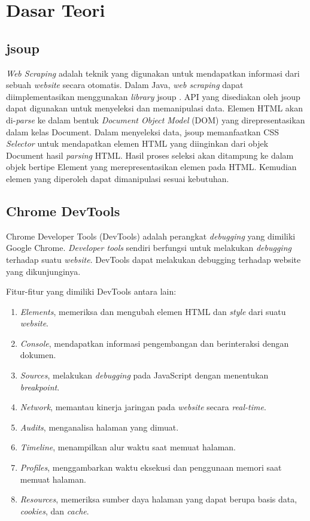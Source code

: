\chapter{Dasar Teori}
\label{chap:Dasar Teori}

\section{jsoup}
\label{sec:jsoup}

\textit{Web Scraping} adalah teknik yang digunakan untuk mendapatkan informasi dari sebuah \textit{website}
secara otomatis. Dalam Java, \textit{web scraping} dapat diimplementasikan menggunakan \textit{library} jsoup \cite{jsoup}. API yang disediakan oleh jsoup dapat digunakan untuk menyeleksi dan memanipulasi data. Elemen HTML akan di-\textit{parse} ke dalam bentuk \textit{Document Object Model} (DOM) yang direpresentasikan dalam kelas Document. Dalam menyeleksi data, jsoup memanfaatkan CSS \textit{Selector} untuk mendapatkan elemen HTML yang diinginkan dari objek Document hasil \textit{parsing} HTML. Hasil proses seleksi akan ditampung ke dalam objek bertipe Element yang merepresentasikan elemen pada HTML. Kemudian elemen yang diperoleh dapat dimanipulasi sesuai kebutuhan.

\section{Chrome DevTools}
\label{sec:devtools}

Chrome Developer Tools (DevTools) \cite{devtools} adalah perangkat \textit{debugging} yang dimiliki Google Chrome. \textit{Developer tools} sendiri berfungsi untuk melakukan \textit{debugging} terhadap suatu \textit{website}. DevTools dapat melakukan debugging terhadap website yang dikunjunginya.

Fitur-fitur yang dimiliki DevTools antara lain:
\begin{enumerate}
	\item \textit{Elements}, memeriksa dan mengubah elemen HTML dan \textit{style} dari suatu \textit{website}.
	\item \textit{Console}, mendapatkan informasi pengembangan dan berinteraksi dengan dokumen.
	\item \textit{Sources}, melakukan \textit{debugging} pada JavaScript dengan menentukan \textit{breakpoint}.
	\item \textit{Network}, memantau kinerja jaringan pada \textit{website} secara \textit{real-time}.
	\item \textit{Audits}, menganalisa halaman yang dimuat.
	\item \textit{Timeline}, menampilkan alur waktu saat memuat halaman.
	\item \textit{Profiles}, menggambarkan waktu eksekusi dan penggunaan memori saat memuat halaman.
	\item \textit{Resources}, memeriksa sumber daya halaman yang dapat berupa basis data, \textit{cookies}, dan \textit{cache}.
\end{enumerate}

